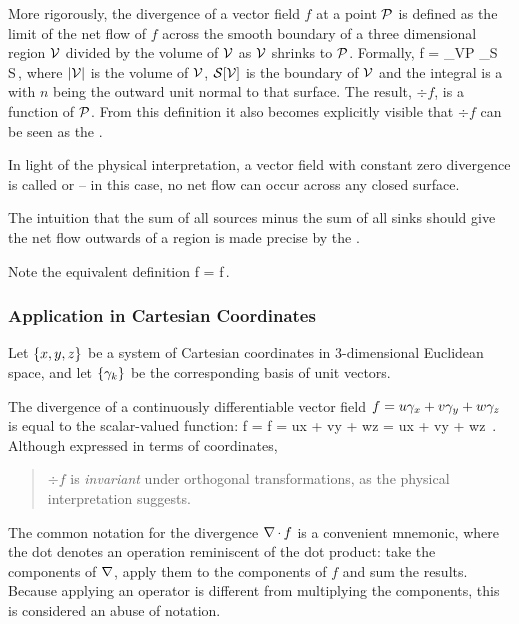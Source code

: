 More rigorously, the divergence of a vector field $f$ at a point $\mathcal{P}$ is defined as the limit of the net flow of $f$ across the smooth boundary of a three dimensional region $\mathcal{V}$ divided by the volume of $\mathcal{V}$ as $\mathcal{V}$ shrinks to $\mathcal{P}$. Formally,
\beq
\div f = \lim_{\region V\to\point P} 
                       \iint_{\surf S} 
                           \,\dx S\,,
\eeq
where $\lvert{\mathcal{V}}\rvert$ is the volume of $\mathcal{V}$, $\mathcal{S}\!\left[{\mathcal{V}}\right]$ is the boundary of $\mathcal{V}$ and the integral is a  with $n$ being the outward unit normal to that surface. The result, $\div f$, is a function of $\mathcal{P}$. From this definition it also becomes explicitly visible that $\div f$ can be seen as the .

In light of the physical interpretation, a vector field with constant zero divergence is called  or  -- in this case, no net flow can occur across any closed surface.

The intuition that the sum of all sources minus the sum of all sinks should give the net flow outwards of a region is made precise by the .

Note the equivalent definition
\beq
\div f = \gder\iprod f\,.
\eeq


\subsubsection{Application in Cartesian Coordinates}
Let $\left\lbrace{x,y,z}\right\rbrace$ be a system of Cartesian coordinates in 3-dimensional Euclidean space, and let $\left\lbrace{\gamma_{k}}\right\rbrace$ be the corresponding basis of unit vectors.

The divergence of a continuously differentiable vector field $f = u\gamma_{x} + v\gamma_{y} + w\gamma_{z}$ is equal to the scalar-valued function:
\beq
\div f = \gder\iprod f = \cder ux + \cder vy + \cder wz = \xpd ux + \xpd vy + \xpd wz \,.
\eeq
Although expressed in terms of coordinates, 
\begin{quote}
$\div f$ is \emph{invariant} under orthogonal transformations, as the physical interpretation suggests.
\end{quote}

The common notation for the divergence $\nabla\operatorname{\cdot} f$ is a convenient mnemonic, where the dot denotes an operation reminiscent of the dot product: take the components of $\nabla$, apply them to the components of $f$ and sum the results. Because applying an operator is different from multiplying the components, this is considered an abuse of notation.


